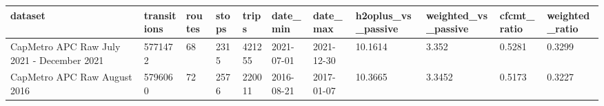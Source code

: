 \begin{tabular}{lllllllllll}
\toprule
dataset & transitions & routes & stops & trips & date\_min & date\_max & h2oplus\_vs\_passive & weighted\_vs\_passive & cfcmt\_ratio & weighted\_ratio \\
\midrule
CapMetro APC Raw July 2021 - December 2021 & 5771472 & 68 & 2315 & 421255 & 2021-07-01 & 2021-12-30 & 10.1614 & 3.352 & 0.5281 & 0.3299 \\
CapMetro APC Raw August 2016 & 5796060 & 72 & 2576 & 220011 & 2016-08-21 & 2017-01-07 & 10.3665 & 3.3452 & 0.5173 & 0.3227 \\
\bottomrule
\end{tabular}
